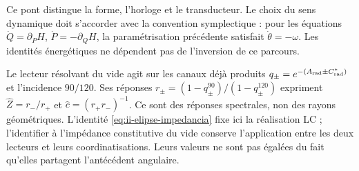 Ce pont distingue la forme, l'horloge et le transducteur. Le choix
du sens dynamique doit s'accorder avec la convention symplectique : pour
les équations \(\dot Q=\partial_PH\),
\(\dot P=-\partial_QH\), la paramétrisation précédente satisfait
\(\dot\theta=-\omega\). Les identités énergétiques ne dépendent pas
de l'inversion de ce parcours.

Le lecteur résolvant du vide agit sur les canaux déjà produits
\(q_\pm=e^{-(A_{\rm rad}\pm C^*_{\rm rad})}\) et l’incidence
\(90/120\). Ses réponses
\(r_\pm=(1-q_\pm^{90})/(1-q_\pm^{120})\) expriment
\(\widehat Z=r_-/r_+\) et \(\widehat c=(r_+r_-)^{-1}\).
Ce sont des réponses spectrales, non des rayons géométriques. L’identité
\eqref{eq:ii-elipse-impedancia} fixe ici la réalisation LC ;
l’identifier à l’impédance constitutive du vide conserve l’application
entre les deux lecteurs et leurs coordinatisations. Leurs valeurs ne sont pas égalées du fait qu’elles partagent
l’antécédent angulaire.
